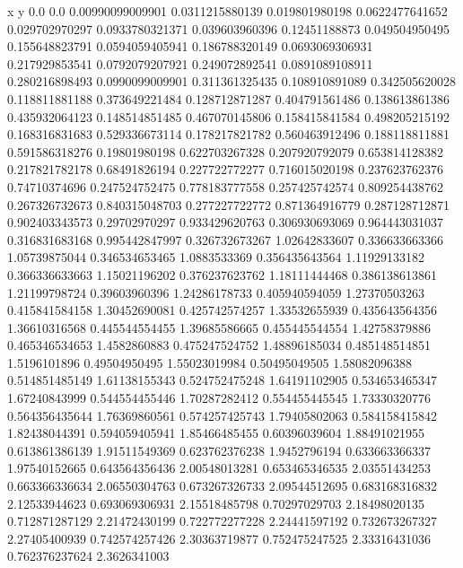               x                y
            0.0              0.0
0.00990099009901  0.0311215880139
 0.019801980198  0.0622477641652
 0.029702970297  0.0933780321371
 0.039603960396    0.12451188873
 0.049504950495   0.155648823791
0.0594059405941   0.186788320149
0.0693069306931   0.217929853541
0.0792079207921   0.249072892541
0.0891089108911   0.280216898493
0.0990099009901   0.311361325435
 0.108910891089   0.342505620028
 0.118811881188   0.373649221484
 0.128712871287   0.404791561486
 0.138613861386   0.435932064123
 0.148514851485   0.467070145806
 0.158415841584   0.498205215192
 0.168316831683   0.529336673114
 0.178217821782   0.560463912496
 0.188118811881   0.591586318276
  0.19801980198   0.622703267328
 0.207920792079   0.653814128382
 0.217821782178    0.68491826194
 0.227722772277   0.716015020198
 0.237623762376    0.74710374696
 0.247524752475   0.778183777558
 0.257425742574   0.809254438762
 0.267326732673   0.840315048703
 0.277227722772   0.871364916779
 0.287128712871   0.902403343573
  0.29702970297   0.933429620763
 0.306930693069   0.964443031037
 0.316831683168   0.995442847997
 0.326732673267    1.02642833607
 0.336633663366    1.05739875044
 0.346534653465     1.0883533369
 0.356435643564    1.11929133182
 0.366336633663    1.15021196202
 0.376237623762    1.18111444468
 0.386138613861    1.21199798724
  0.39603960396    1.24286178733
 0.405940594059    1.27370503263
 0.415841584158    1.30452690081
 0.425742574257    1.33532655939
 0.435643564356    1.36610316568
 0.445544554455    1.39685586665
 0.455445544554    1.42758379886
 0.465346534653     1.4582860883
 0.475247524752    1.48896185034
 0.485148514851     1.5196101896
  0.49504950495    1.55023019984
  0.50495049505    1.58082096388
 0.514851485149    1.61138155343
 0.524752475248    1.64191102905
 0.534653465347    1.67240843999
 0.544554455446    1.70287282412
 0.554455445545    1.73330320776
 0.564356435644    1.76369860561
 0.574257425743    1.79405802063
 0.584158415842    1.82438044391
 0.594059405941    1.85466485455
  0.60396039604    1.88491021955
 0.613861386139    1.91511549369
 0.623762376238     1.9452796194
 0.633663366337    1.97540152665
 0.643564356436    2.00548013281
 0.653465346535    2.03551434253
 0.663366336634    2.06550304763
 0.673267326733    2.09544512695
 0.683168316832    2.12533944623
 0.693069306931    2.15518485798
  0.70297029703    2.18498020135
 0.712871287129    2.21472430199
 0.722772277228    2.24441597192
 0.732673267327    2.27405400939
 0.742574257426    2.30363719877
 0.752475247525    2.33316431036
 0.762376237624     2.3626341003
